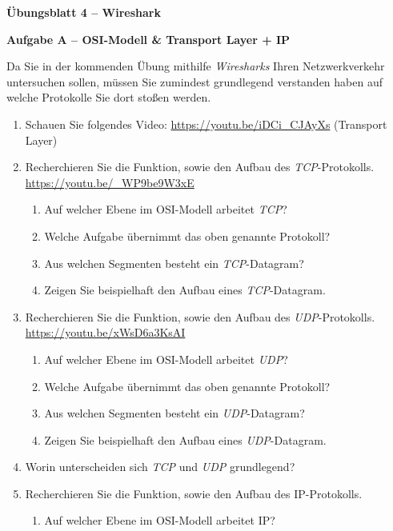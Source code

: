 \documentclass[paper=a4,fontsize=11pt]{scrartcl}%
\numberwithin{equation}{section}
\begin{document}
\begin{center}
\Large{\textbf{Übungsblatt 4 -- Wireshark}}
\end{center}

\begin{center}\Large{\textbf{Aufgabe A -- OSI-Modell \& Transport Layer + IP}}\end{center}\vskip0.25in
Da Sie in der kommenden Übung mithilfe \emph{Wiresharks} Ihren Netzwerkverkehr untersuchen sollen, müssen Sie zumindest grundlegend verstanden haben auf welche Protokolle Sie dort stoßen werden.
\begin{enumerate}
	\item Schauen Sie folgendes Video: \url{https://youtu.be/iDCi_CJAyXs} (Transport Layer)
	\item Recherchieren Sie die Funktion, sowie den Aufbau des \emph{TCP}-Protokolls.\\
	\url{https://youtu.be/_WP9be9W3xE}
	\begin{enumerate}
		\item Auf welcher Ebene im OSI-Modell arbeitet \emph{TCP}?
		\item Welche Aufgabe übernimmt das oben genannte Protokoll?
		\item Aus welchen Segmenten besteht ein \emph{TCP}-Datagram?
		\item Zeigen Sie beispielhaft den Aufbau eines \emph{TCP}-Datagram.
	\end{enumerate}
	\item Recherchieren Sie die Funktion, sowie den Aufbau des \emph{UDP}-Protokolls.\\
	\url{https://youtu.be/xWsD6a3KsAI}
	\begin{enumerate}
		\item Auf welcher Ebene im OSI-Modell arbeitet \emph{UDP}?
		\item Welche Aufgabe übernimmt das oben genannte Protokoll?
		\item Aus welchen Segmenten besteht ein \emph{UDP}-Datagram?
		\item Zeigen Sie beispielhaft den Aufbau eines \emph{UDP}-Datagram.
	\end{enumerate}
	\item Worin unterscheiden sich \emph{TCP} und \emph{UDP} grundlegend?
	\item Recherchieren Sie die Funktion, sowie den Aufbau des IP-Protokolls.
	\begin{enumerate}
		\item Auf welcher Ebene im OSI-Modell arbeitet IP?

\end{enumerate}
\end{enumerate}
\end{document}
